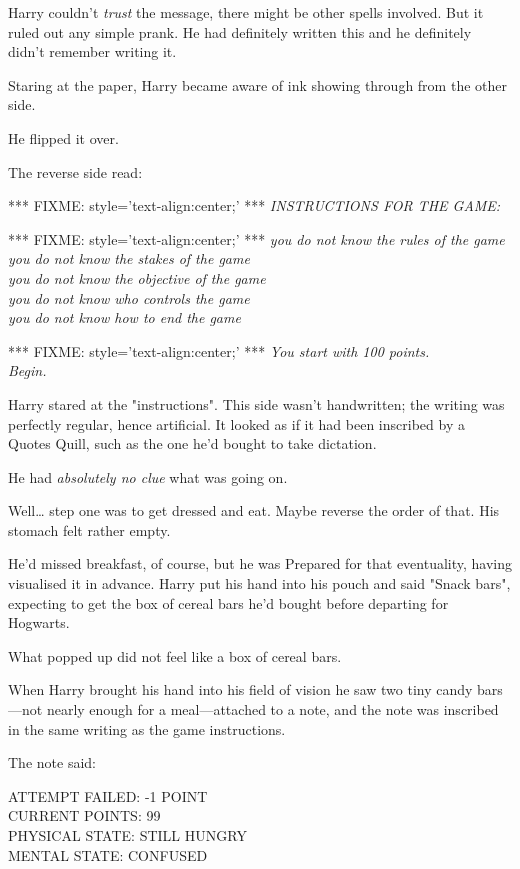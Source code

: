Harry couldn't \emph{trust} the message, there might be other spells involved. 
But it ruled out any simple prank. He had definitely written this and he 
definitely didn't remember writing it.

Staring at the paper, Harry became aware of ink showing through from the other 
side.

He flipped it over.

The reverse side read:

*** FIXME: style='text-align:center;' ***
\emph{INSTRUCTIONS FOR THE GAME:}

*** FIXME: style='text-align:center;' ***
\emph{you do not know the rules of the game\\
you do not know the stakes of the game\\
you do not know the objective of the game\\
you do not know who controls the game\\
you do not know how to end the game}

*** FIXME: style='text-align:center;' ***
\emph{You start with 100 points.\\
Begin.}

Harry stared at the "instructions". This side wasn't handwritten; the writing 
was perfectly regular, hence artificial. It looked as if it had been inscribed 
by a Quotes Quill, such as the one he'd bought to take dictation.

He had \emph{absolutely no clue} what was going on.

Well{\ldots} step one was to get dressed and eat. Maybe reverse the order of 
that. His stomach felt rather empty.

He'd missed breakfast, of course, but he was Prepared for that eventuality, 
having visualised it in advance. Harry put his hand into his pouch and said 
"Snack bars", expecting to get the box of cereal bars he'd bought before 
departing for Hogwarts.

What popped up did not feel like a box of cereal bars.

When Harry brought his hand into his field of vision he saw two tiny candy 
bars---not nearly enough for a meal---attached to a note, and the note was 
inscribed in the same writing as the game instructions.

The note said:

ATTEMPT FAILED: -1 POINT\\
CURRENT POINTS: 99\\
PHYSICAL STATE: STILL HUNGRY\\
MENTAL STATE: CONFUSED

